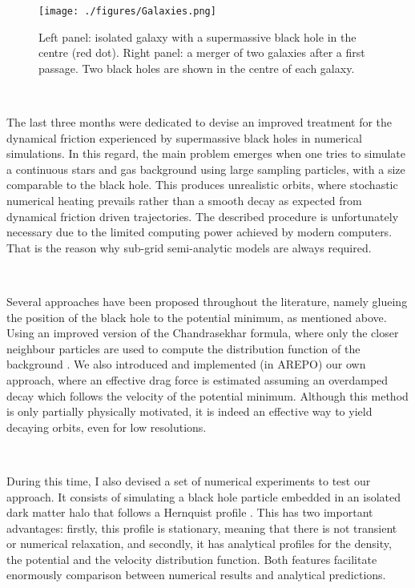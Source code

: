 \documentclass[a4,useAMS,usenatbib,usegraphicx,12pt]{article}
\begin{document}
\begin{figure}[!htbp]
\centering

  \texttt{[image: ./figures/Galaxies.png]}
  
  \caption{\small Left panel: isolated galaxy with a supermassive black 
  hole in the centre (red dot). Right panel: a merger of two galaxies 
  after a first passage. Two black holes are shown in the centre of each
  galaxy.}

  \label{fig:simulations}

\end{figure}

\

The last three months were dedicated to devise an improved treatment for the 
dynamical friction experienced by supermassive black holes in numerical 
simulations. In this regard, the main problem emerges when one tries to simulate
a continuous stars and gas background using large sampling particles, with a size 
comparable to the black hole. This produces unrealistic orbits, where stochastic 
numerical heating prevails rather than a smooth decay as expected from dynamical
friction driven trajectories. The described procedure is unfortunately necessary 
due to the limited computing power achieved by modern computers. That is the 
reason why sub-grid semi-analytic models are always required. 

\

Several approaches have been proposed throughout the literature, namely glueing 
the position of the black hole to the potential minimum, as mentioned above. 
Using an improved version of the Chandrasekhar formula, where only the closer 
neighbour particles are used to compute the distribution function of the 
background \citep{Tremmel2015}. We also introduced and implemented (in AREPO)
our own approach, where an effective drag force is estimated assuming an 
overdamped decay which follows the velocity of the potential minimum. Although 
this method is only partially physically motivated, it is indeed an effective 
way to yield decaying orbits, even for low resolutions.

\

During this time, I also devised a set of numerical experiments to test our 
approach. It consists of simulating a black hole particle embedded in an 
isolated dark matter halo that follows a Hernquist profile 
\citep{Hernquist1990}. This has two important advantages: firstly, this profile 
is stationary, meaning that there is not transient or numerical relaxation, 
and secondly, it has analytical profiles for the density, the potential and 
the velocity distribution function. Both features facilitate enormously 
comparison between numerical results and analytical predictions.
\end{document}
